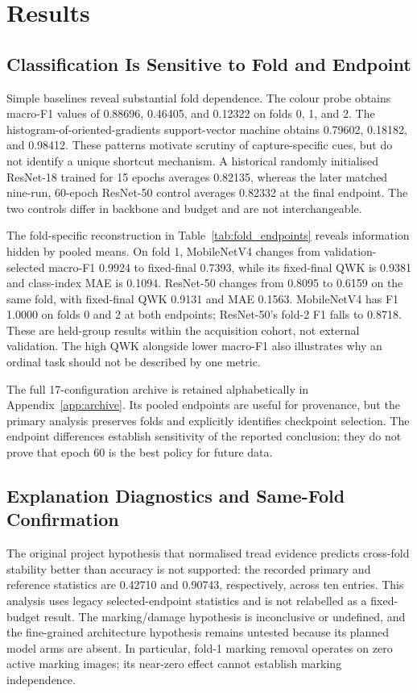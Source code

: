 \section{Results}
\label{sec:results}
\subsection{Classification Is Sensitive to Fold and Endpoint}
Simple baselines reveal substantial fold dependence. The colour probe obtains macro-F1 values of 0.88696, 0.46405, and 0.12322 on folds 0, 1, and 2. The histogram-of-oriented-gradients support-vector machine obtains 0.79602, 0.18182, and 0.98412. These patterns motivate scrutiny of capture-specific cues, but do not identify a unique shortcut mechanism. A historical randomly initialised ResNet-18 trained for 15 epochs averages 0.82135, whereas the later matched nine-run, 60-epoch ResNet-50 control averages 0.82332 at the final endpoint. The two controls differ in backbone and budget and are not interchangeable.

The fold-specific reconstruction in Table~\ref{tab:fold_endpoints} reveals information hidden by pooled means. On fold 1, MobileNetV4 changes from validation-selected macro-F1 0.9924 to fixed-final 0.7393, while its fixed-final QWK is 0.9381 and class-index MAE is 0.1094. ResNet-50 changes from 0.8095 to 0.6159 on the same fold, with fixed-final QWK 0.9131 and MAE 0.1563. MobileNetV4 has F1 1.0000 on folds 0 and 2 at both endpoints; ResNet-50's fold-2 F1 falls to 0.8718. These are held-group results within the acquisition cohort, not external validation. The high QWK alongside lower macro-F1 also illustrates why an ordinal task should not be described by one metric.

The full 17-configuration archive is retained alphabetically in Appendix~\ref{app:archive}. Its pooled endpoints are useful for provenance, but the primary analysis preserves folds and explicitly identifies checkpoint selection. The endpoint differences establish sensitivity of the reported conclusion; they do not prove that epoch 60 is the best policy for future data.


\subsection{Explanation Diagnostics and Same-Fold Confirmation}
The original project hypothesis that normalised tread evidence predicts cross-fold stability better than accuracy is not supported: the recorded primary and reference statistics are 0.42710 and 0.90743, respectively, across ten entries. This analysis uses legacy selected-endpoint statistics and is not relabelled as a fixed-budget result. The marking/damage hypothesis is inconclusive or undefined, and the fine-grained architecture hypothesis remains untested because its planned model arms are absent. In particular, fold-1 marking removal operates on zero active marking images; its near-zero effect cannot establish marking independence.

